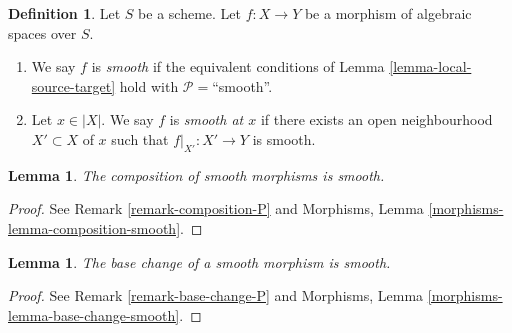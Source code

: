 \documentclass{stacks-project}
\theoremstyle{plain}
\newtheorem{lemma}[subsection]{Lemma}
\theoremstyle{definition}
\newtheorem{definition}[subsection]{Definition}
\theoremstyle{remark}
\numberwithin{equation}{subsection}
\begin{document}
\begin{definition}
\label{definition-smooth}
Let $S$ be a scheme.
Let $f : X \to Y$ be a morphism of algebraic spaces over $S$.
\begin{enumerate}
\item We say $f$ is {\it smooth} if the equivalent conditions of
Lemma \ref{lemma-local-source-target} hold with
$\mathcal{P} =$``smooth''.
\item Let $x \in |X|$. We say $f$ is {\it smooth at $x$} if there exists
an open neighbourhood $X' \subset X$ of $x$ such that $f|_{X'} : X' \to Y$
is smooth.
\end{enumerate}
\end{definition}

\begin{lemma}
\label{lemma-composition-smooth}
The composition of smooth morphisms is smooth.
\end{lemma}

\begin{proof}
See Remark \ref{remark-composition-P} and
Morphisms, Lemma \ref{morphisms-lemma-composition-smooth}.
\end{proof}

\begin{lemma}
\label{lemma-base-change-smooth}
The base change of a smooth morphism is smooth.
\end{lemma}

\begin{proof}
See Remark \ref{remark-base-change-P} and
Morphisms, Lemma \ref{morphisms-lemma-base-change-smooth}.
\end{proof}
\end{document}
